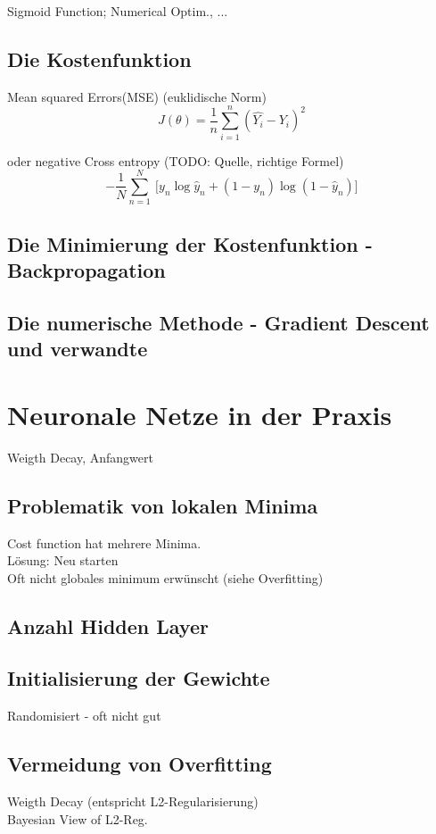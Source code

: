 Sigmoid Function; Numerical Optim., 
...

\subsection{Die Kostenfunktion}
Mean squared Errors(MSE) (euklidische Norm)
\begin{equation}
J(\theta) = \frac{1}{n} \sum_{i=1}^n \left (\hat{Y_i} - Y_i \right)^2
\end{equation}

oder negative Cross entropy (TODO: Quelle, richtige Formel)
\begin{equation}
    -\frac1N\sum_{n=1}^N\ \bigg[y_n  \log \hat y_n + (1 - y_n)  \log (1 - \hat y_n)\bigg]
\end{equation}

\subsection{Die Minimierung der Kostenfunktion - Backpropagation}

\subsection{Die numerische Methode - Gradient Descent und verwandte}

\section{Neuronale Netze in der Praxis}
Weigth Decay, Anfangwert

\subsection{Problematik von lokalen Minima}
Cost function hat mehrere Minima.
\\
Lösung: Neu starten
\\ 
Oft nicht globales minimum erwünscht (siehe Overfitting)

\subsection{Anzahl Hidden Layer}

\subsection{Initialisierung der Gewichte}
Randomisiert - oft nicht gut

\subsection{Vermeidung von Overfitting}
Weigth Decay (entspricht L2-Regularisierung)
\\Bayesian View of L2-Reg.
